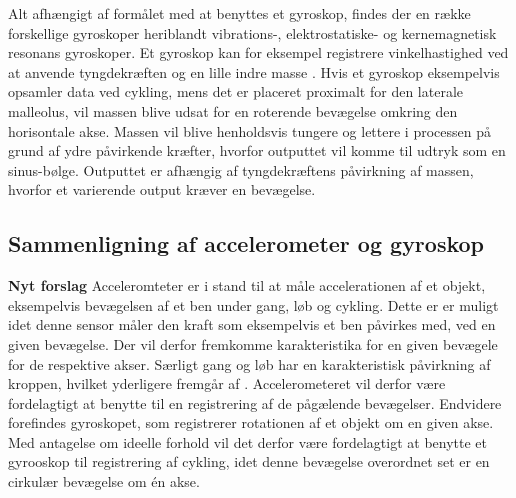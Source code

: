 Alt afhængigt af formålet med at benyttes et gyroskop, findes der en række forskellige gyroskoper heriblandt vibrations-, elektrostatiske- og kernemagnetisk resonans gyroskoper. \citep{LuingeVeltink2005,TittertonWeston2004} Et gyroskop kan for eksempel registrere vinkelhastighed ved at anvende tyngdekræften og en lille indre masse \citep{Sparkfun_gyro,Barbour2014}. Hvis et gyroskop eksempelvis opsamler data ved cykling, mens det er placeret proximalt for den laterale malleolus, vil massen blive udsat for en roterende bevægelse omkring den horisontale akse. Massen vil blive henholdsvis tungere og lettere i processen på grund af ydre påvirkende kræfter, hvorfor outputtet vil komme til udtryk som en sinus-bølge. Outputtet er afhængig af tyngdekræftens påvirkning af massen, hvorfor et varierende output kræver en bevægelse.%
%
\subsection{Sammenligning af accelerometer og gyroskop}
\textbf{Nyt forslag}
Acceleromteter er i stand til at måle accelerationen af et objekt, eksempelvis bevægelsen af et ben under gang, løb og cykling. Dette er er muligt idet denne sensor måler den kraft som eksempelvis et ben påvirkes med, ved en given bevægelse. Der vil derfor fremkomme karakteristika for en given bevægele for de respektive akser. Særligt gang og løb har en karakteristisk påvirkning af kroppen, hvilket yderligere fremgår af . Accelerometeret vil derfor være fordelagtigt at benytte til en registrering af de pågælende bevægelser. \newline
Endvidere forefindes gyroskopet, som registrerer rotationen af et objekt om en given akse. Med antagelse om ideelle forhold vil det derfor være fordelagtigt at benytte et gyrooskop til registrering af cykling, idet denne bevægelse overordnet set er en cirkulær bevægelse om én akse. 


